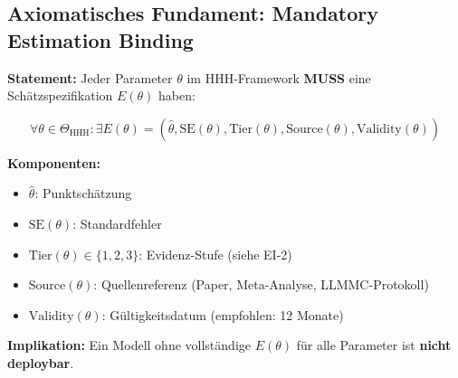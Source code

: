 \subsection{Axiomatisches Fundament: Mandatory Estimation Binding}

\begin{tcolorbox}[colback=gray!5!white, colframe=gray!75!black,
    title=\textbf{Axiom EI-1: Mandatory Estimation Binding}]

\textbf{Statement:} Jeder Parameter $\theta$ im HHH-Framework \textbf{MUSS} eine Schätzspezifikation $E(\theta)$ haben:

\begin{equation}
\boxed{\forall \theta \in \Theta_{\text{HHH}}: \exists E(\theta) = (\hat{\theta}, \text{SE}(\theta), \text{Tier}(\theta), \text{Source}(\theta), \text{Validity}(\theta))}
\end{equation}

\textbf{Komponenten:}
\begin{itemize}[nosep]
    \item $\hat{\theta}$: Punktschätzung
    \item $\text{SE}(\theta)$: Standardfehler
    \item $\text{Tier}(\theta) \in \{1, 2, 3\}$: Evidenz-Stufe (siehe EI-2)
    \item $\text{Source}(\theta)$: Quellenreferenz (Paper, Meta-Analyse, LLMMC-Protokoll)
    \item $\text{Validity}(\theta)$: Gültigkeitsdatum (empfohlen: 12 Monate)
\end{itemize}

\textbf{Implikation:} Ein Modell ohne vollständige $E(\theta)$ für alle Parameter ist \textbf{nicht deploybar}.

\end{tcolorbox}

